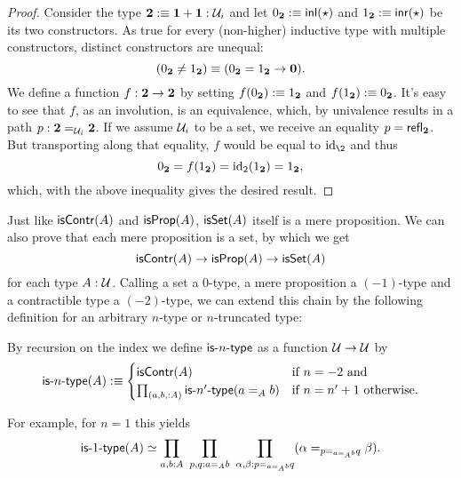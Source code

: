 \begin{proof}
Consider the type $\mathbf{2} :\equiv \mathbf{1} + \mathbf{1} : \mathcal{U}_i$ and let
$0_{\mathbf{2}} :\equiv \mathsf{inl}(\star)$ and $1_{\mathbf{2}} :\equiv \mathsf{inr}(\star)$ be its
two constructors.
As true for every (non-higher) inductive type with multiple constructors,
distinct constructors are unequal: %
\begin{equation*}
(0_{\mathbf{2}} \neq 1_{\mathbf{2}}) \equiv (0_{\mathbf{2}} = 1_{\mathbf{2}} \to \mathbf{0}) \text{.}
\end{equation*}
We define a function $f : \mathbf{2} \to \mathbf{2}$ by setting $f(0_{\mathbf{2}}) :\equiv 1_{\mathbf{2}}$
and $f(1_{\mathbf{2}}) :\equiv 0_{\mathbf{2}}$.
It's easy to see that $f$, as an involution, is an equivalence, which, by univalence
results in a path $p : \mathbf{2} =_{\mathcal{U}_i} \mathbf{2}$.
If we assume $\mathcal{U}_i$ to be a set, we receive an equality $p = \mathsf{refl}_{\mathbf{2}}$.
But transporting along that equality, $f$ would be equal to $\id_\2$ and thus
\begin{equation*}
0_{\mathbf{2}} = f(1_{\mathbf{2}}) = \operatorname{id}_2(1_{\mathbf{2}}) = 1_{\mathbf{2}} \text{,}
\end{equation*}
which, with the above inequality gives the desired result.
\end{proof}

Just like $\mathsf{isContr}(A)$ and $\mathsf{isProp}(A)$, $\mathsf{isSet}(A)$ itself is a mere proposition.
We can also prove that each mere proposition is a set, by which we get
\begin{equation*}
\mathsf{isContr}(A) \to \mathsf{isProp}(A) \to \mathsf{isSet}(A)
\end{equation*}
for each type $A : \mathcal{U}$. Calling a set a 0-type, a mere proposition a $(-1)$-type
and a contractible type a $(-2)$-type, we can extend this chain by the following
definition for an arbitrary $n$-type or $n$-truncated type:
\begin{defn}
By recursion on the index we define $\mathsf{is}\mbox{-}{n}\mbox{-}\mathsf{type}$ as a function $\mathcal{U} \to \mathcal{U}$ by
\begin{equation*}
\mathsf{is}\mbox{-}{n}\mbox{-}\mathsf{type}(A) :\equiv \begin{cases}
\mathsf{isContr}(A) & \text{if $n = -2$ and} \\
\prod_{(a, b, : A)} \mathsf{is}\mbox{-}{n'}\mbox{-}\mathsf{type}(a =_A b) & \text{if $n = n' + 1$ otherwise.}
\end{cases}
\end{equation*}
\end{defn}

For example, for $n = 1$ this yields
\begin{equation*}
\mathsf{is}\mbox{-}{1}\mbox{-}\mathsf{type}(A) \simeq \prod_{a, b : A} ~ \prod_{p, q : a =_A b}
	~ \prod_{\alpha, \beta : p =_{a =_A b} q} (\alpha =_{p =_{a =_A b} q} \beta) \text{.}
\end{equation*}

